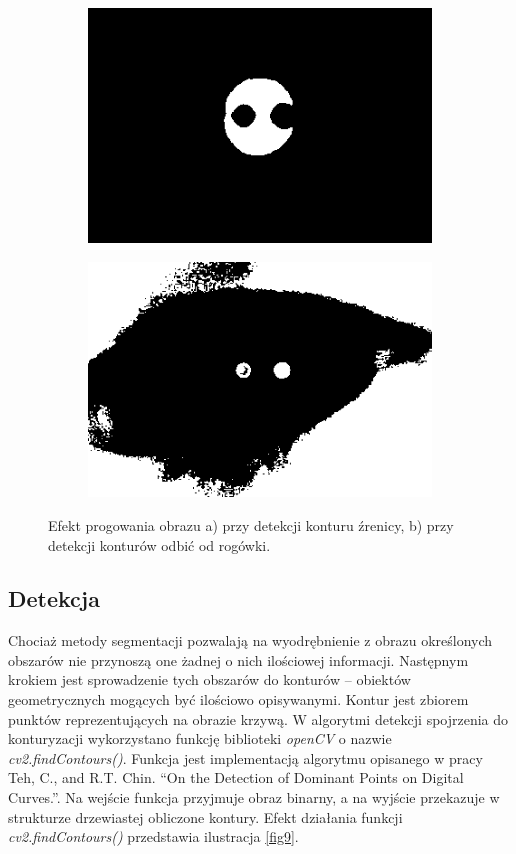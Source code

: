 \begin{figure}[h!]
  \begin{subfigure}[h!]{0.3\textwidth}\subcaption{\label{fig8a}}
    \centering
    \includegraphics[scale=0.4]{images/9.png}
  \end{subfigure}\hspace{2.5cm}
  \begin{subfigure}[h!]{0.3\textwidth}\subcaption{\label{fig8b}}
    \centering
    \includegraphics[scale=0.4]{images/10.png}
  \end{subfigure}
  \caption{Efekt progowania obrazu {a)} przy detekcji konturu źrenicy, {b)} przy detekcji konturów odbić od rogówki. \label{fig8}}
\end{figure}

\newpage
\subsection{Detekcja}
Chociaż metody segmentacji pozwalają na wyodrębnienie z obrazu określonych obszarów nie przynoszą one żadnej o nich ilościowej informacji. Następnym krokiem jest sprowadzenie tych obszarów do konturów -- obiektów geometrycznych mogących być ilościowo opisywanymi. Kontur jest zbiorem punktów reprezentujących na obrazie krzywą. W algorytmi detekcji spojrzenia do konturyzacji wykorzystano funkcję biblioteki \textit{openCV} o nazwie \textit{cv2.findContours()}. Funkcja jest implementacją algorytmu opisanego w pracy Teh, C., and R.T. Chin. “On the Detection of Dominant Points on Digital Curves.”. Na wejście funkcja przyjmuje obraz binarny, a na wyjście przekazuje w strukturze drzewiastej obliczone kontury. Efekt działania funkcji \textit{cv2.findContours()} przedstawia ilustracja \ref{fig9}.

